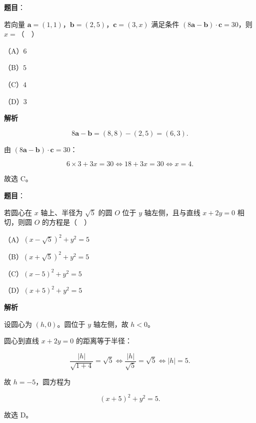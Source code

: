 \begin{answer}

\textbf{题目}：

若向量 $\boldsymbol a=(1,1)$，$\boldsymbol b=(2,5)$，$\boldsymbol c=(3,x)$ 满足条件 $(8\boldsymbol a-\boldsymbol b)\cdot\boldsymbol c=30$，则 $x=$（　）

（A）$6$

（B）$5$

（C）$4$

（D）$3$

\textbf{解析}

\nopagebreak[4]
\[8\boldsymbol a-\boldsymbol b=(8,8)-(2,5)=(6,3).\]

由 $(8\boldsymbol a-\boldsymbol b)\cdot\boldsymbol c=30$：

\nopagebreak[4]
\[6\times3+3x=30\iff 18+3x=30\iff x=4.\]

故选 C。


\end{answer}
\begin{answer}

\textbf{题目}：

若圆心在 $x$ 轴上、半径为 $\sqrt5$ 的圆 $O$ 位于 $y$ 轴左侧，且与直线 $x+2y=0$ 相切，则圆 $O$ 的方程是（　）

（A）$(x-\sqrt5)^2+y^2=5$

（B）$(x+\sqrt5)^2+y^2=5$

（C）$(x-5)^2+y^2=5$

（D）$(x+5)^2+y^2=5$

\textbf{解析}

设圆心为 $(h,0)$。圆位于 $y$ 轴左侧，故 $h<0$。

圆心到直线 $x+2y=0$ 的距离等于半径：

\nopagebreak[4]
\[\frac{|h|}{\sqrt{1+4}}=\sqrt5
\iff \frac{|h|}{\sqrt5}=\sqrt5
\iff |h|=5.\]

故 $h=-5$，圆方程为

\nopagebreak[4]
\[(x+5)^2+y^2=5.\]

故选 D。


\end{answer}
